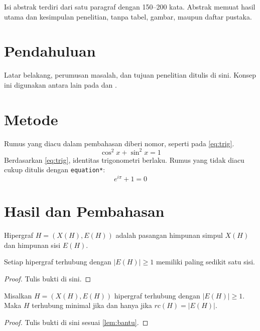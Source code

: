 \documentclass{prodimat}
\begin{document}
\maketitle

\begin{abstrak}
Isi abstrak terdiri dari satu paragraf dengan 150--200 kata. Abstrak memuat hasil utama dan kesimpulan penelitian, tanpa tabel, gambar, maupun daftar pustaka.
\end{abstrak}

\section{Pendahuluan}
Latar belakang, perumusan masalah, dan tujuan penelitian ditulis di sini. Konsep ini digunakan antara lain pada \citet{light2008} dan \citep{wooldridge2012}.

\section{Metode}
Rumus yang diacu dalam pembahasan diberi nomor, seperti pada \eqref{eq:trig}.
\begin{equation}\label{eq:trig}
  \cos^{2}x + \sin^{2}x = 1
\end{equation}
Berdasarkan \eqref{eq:trig}, identitas trigonometri berlaku. Rumus yang tidak diacu cukup ditulis dengan \texttt{equation*}:
\begin{equation*}
  e^{i\pi} + 1 = 0
\end{equation*}

\section{Hasil dan Pembahasan}
\begin{definisi}\label{def:hipergraf}
Hipergraf $H=(X(H),E(H))$ adalah pasangan himpunan simpul $X(H)$ dan himpunan sisi $E(H)$.
\end{definisi}

\begin{lema}\label{lem:bantu}
Setiap hipergraf terhubung dengan $|E(H)|\ge 1$ memiliki paling sedikit satu sisi.
\end{lema}
\begin{proof}
Tulis bukti di sini.
\end{proof}

\begin{teorema}\label{teo:utama}
Misalkan $H=(X(H),E(H))$ hipergraf terhubung dengan $|E(H)|\ge 1$. Maka $H$ terhubung minimal jika dan hanya jika $rc(H)=|E(H)|$.
\end{teorema}
\begin{proof}
Tulis bukti di sini sesuai \cref{lem:bantu}.
\end{proof}
\end{document}
